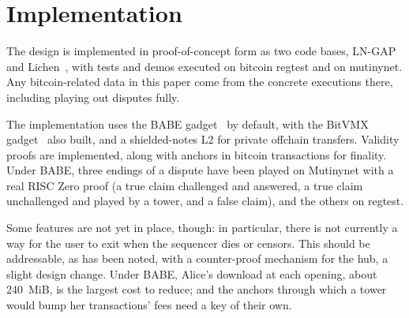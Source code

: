 \documentclass[11pt]{article}
\begin{document}
\section{Implementation}
\label{sec:status}

The design is implemented in proof-of-concept form as two code bases, LN-GAP~\cite{lngapcode} and Lichen~\cite{lichencode}, with tests and demos executed on bitcoin regtest and on mutinynet. Any bitcoin-related data in this paper come from the concrete executions there, including playing out disputes fully.

The implementation uses the BABE gadget~\cite{lichenbabe} by default, with the BitVMX gadget~\cite{lichenbitvmx} also built, and a shielded-notes L2 for private offchain transfers. Validity proofs are implemented, along with anchors in bitcoin transactions for finality. Under BABE, three endings of a dispute have been played on Mutinynet with a real RISC Zero proof (a true claim challenged and answered, a true claim unchallenged and played by a tower, and a false claim), and the others on regtest.

Some features are not yet in place, though: in particular, there is not currently a way for the user to exit when the sequencer dies or censors. This should be addressable, as has been noted, with a counter-proof mechanism for the hub, a slight design change. Under BABE, Alice's download at each opening, about 240~MiB, is the largest cost to reduce; and the anchors through which a tower would bump her transactions' fees need a key of their own.
\end{document}
